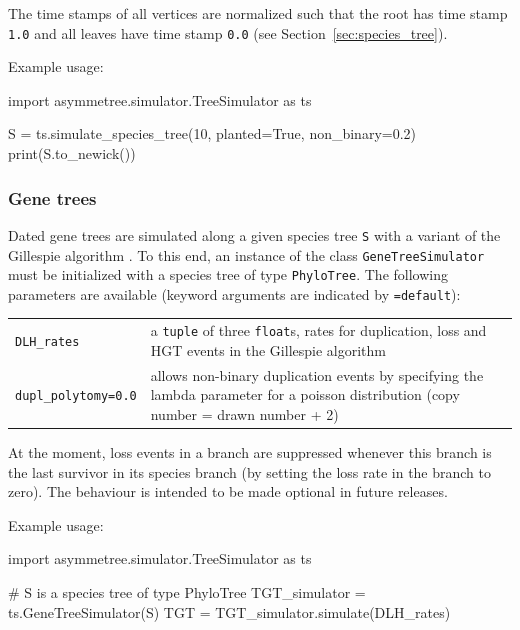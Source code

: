 \documentclass[hidelinks,11pt]{scrreprt}
\begin{document}
The time stamps of all vertices are normalized such that the root has time stamp \texttt{1.0} and all leaves have time stamp \texttt{0.0} (see Section~\ref{sec:species_tree}).

Example usage:
\vspace{2mm}
\begin{python}
import asymmetree.simulator.TreeSimulator as ts

S = ts.simulate_species_tree(10, planted=True, non_binary=0.2)
print(S.to_newick())
\end{python}
\vspace{2mm}

\subsubsection{Gene trees}

Dated gene trees are simulated along a given species tree \texttt{S} with a variant of the Gillespie algorithm \citep{gillespie1976}.
To this end, an instance of the class \texttt{GeneTreeSimulator} must be initialized with a species tree of type \texttt{PhyloTree}.
The following parameters are available (keyword arguments are indicated by \texttt{=default}):

\vspace{3mm}
\renewcommand{\arraystretch}{1.5}
\begin{tabularx}{0.95\textwidth} { >{\raggedright\arraybackslash}p{4cm} >{\raggedright\arraybackslash}X }
	\texttt{DLH\_rates} & a \texttt{tuple} of three \texttt{float}s, rates for duplication, loss and HGT events in the Gillespie algorithm\\
	\texttt{dupl\_polytomy=0.0}  & allows non-binary duplication events by specifying
	the lambda parameter for a poisson distribution (copy number = drawn number + 2)\\
\end{tabularx}
\vspace{3mm}

At the moment, loss events in a branch are suppressed whenever this branch is the last survivor in its species branch (by setting the loss rate in the branch to zero).
The behaviour is intended to be made optional in future releases.

Example usage:
\vspace{2mm}
\begin{python}
import asymmetree.simulator.TreeSimulator as ts

# S is a species tree of type PhyloTree
TGT_simulator = ts.GeneTreeSimulator(S)
TGT = TGT_simulator.simulate(DLH_rates)
\end{python}
\vspace{2mm}
\end{document}
